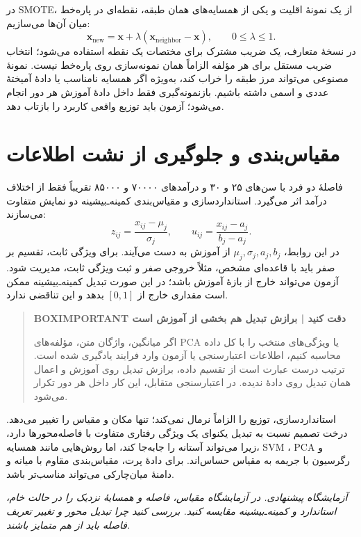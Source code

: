 در SMOTE، از یک نمونهٔ اقلیت و یکی از همسایه‌های همان طبقه، نقطه‌ای در پاره‌خط میان آن‌ها می‌سازیم:
\[\mathbf x_{\mathrm{new}}=\mathbf x+\lambda(\mathbf x_{\mathrm{neighbor}}-\mathbf x),\qquad 0\le\lambda\le1.\]
در نسخهٔ متعارف، یک ضریب مشترک برای مختصات یک نقطه استفاده می‌شود؛ انتخاب ضریب مستقل برای هر مؤلفه الزاماً همان نمونه‌سازی روی پاره‌خط نیست. نمونهٔ مصنوعی می‌تواند مرز طبقه را خراب کند، به‌ویژه اگر همسایه نامناسب یا دادهٔ آمیختهٔ عددی و اسمی داشته باشیم. بازنمونه‌گیری فقط داخل دادهٔ آموزش هر دور انجام می‌شود؛ آزمون باید توزیع واقعی کاربرد را بازتاب دهد.

\section{مقیاس‌بندی و جلوگیری از نشت اطلاعات}
فاصلهٔ دو فرد با سن‌های ۲۵ و ۳۰ و درآمدهای ۷۰۰۰۰ و ۸۵۰۰۰ تقریباً فقط از اختلاف درآمد اثر می‌گیرد. استانداردسازی و مقیاس‌بندی کمینه‌ـ‌بیشینه دو نمایش متفاوت می‌سازند:
\[z_{ij}=\frac{x_{ij}-\mu_j}{\sigma_j},\qquad u_{ij}=\frac{x_{ij}-a_j}{b_j-a_j}.\]
در این روابط، $\mu_j,\sigma_j,a_j,b_j$ از آموزش به دست می‌آیند. برای ویژگی ثابت، تقسیم بر صفر باید با قاعده‌ای مشخص، مثلاً خروجی صفر و ثبت ویژگی ثابت، مدیریت شود. آزمون می‌تواند خارج از بازهٔ آموزش باشد؛ در این صورت تبدیل کمینه‌ـ‌بیشینه ممکن است مقداری خارج از $[0,1]$ بدهد و این تناقضی ندارد.

\begin{quote}\textbf{BOXIMPORTANT دقت کنید | برازش تبدیل هم بخشی از آموزش است}\par 
اگر میانگین، واژگان متن، مؤلفه‌های PCA یا ویژگی‌های منتخب را با کل داده محاسبه کنیم، اطلاعات اعتبارسنجی یا آزمون وارد فرایند یادگیری شده است. ترتیب درست عبارت است از تقسیم داده، برازش تبدیل روی آموزش و اعمال همان تبدیل روی دادهٔ ندیده. در اعتبارسنجی متقابل، این کار داخل هر دور تکرار می‌شود.
\end{quote}

استانداردسازی، توزیع را الزاماً نرمال نمی‌کند؛ تنها مکان و مقیاس را تغییر می‌دهد. درخت تصمیم نسبت به تبدیل یکنوای یک ویژگی رفتاری متفاوت با فاصله‌محورها دارد، زیرا می‌تواند آستانه را جابه‌جا کند، اما روش‌هایی مانند همسایه، SVM ، PCA و رگرسیون با جریمه به مقیاس حساس‌اند. برای دادهٔ پرت، مقیاس‌بندی مقاوم با میانه و دامنهٔ میان‌چارکی می‌تواند مناسب‌تر باشد.

\textit{آزمایشگاه پیشنهادی. در آزمایشگاه مقیاس، فاصله و همسایهٔ نزدیک را در حالت خام، استاندارد و کمینه‌ـ‌بیشینه مقایسه کنید. بررسی کنید چرا تبدیل محور و تغییر تعریف فاصله باید از هم متمایز باشند.}\par 

